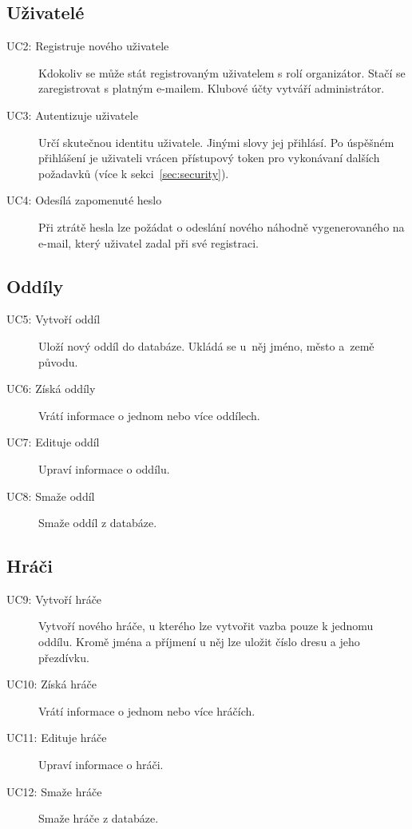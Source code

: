 \subsection*{Uživatelé}
  \begin{description}
    \item[UC2: Registruje nového uživatele]
      Kdokoliv se může stát registrovaným uživatelem s rolí organizátor. Stačí se zaregistrovat s platným e-mailem.
      Klubové účty vytváří administrátor.
    \item[UC3: Autentizuje uživatele]
      Určí skutečnou identitu uživatele. Jinými slovy jej přihlásí. Po úspěšném přihlášení je uživateli vrácen
      přístupový token pro vykonávaní dalších požadavků (více k sekci~\ref{sec:security}).
    \item[UC4: Odesílá zapomenuté heslo]
      Při ztrátě hesla lze požádat o odeslání nového náhodně vygenerovaného na e-mail, který uživatel zadal při své registraci.
  \end{description}

\subsection*{Oddíly}
  \begin{description}
    \item[UC5: Vytvoří oddíl]
      Uloží nový oddíl do databáze. Ukládá se u~něj jméno, město a~země původu.
    \item[UC6: Získá oddíly]
      Vrátí informace o jednom nebo více oddílech.
    \item[UC7: Edituje oddíl]
      Upraví informace o oddílu.
    \item[UC8: Smaže oddíl]
      Smaže oddíl z databáze.
  \end{description}

\subsection*{Hráči}
  \begin{description}
    \item[UC9: Vytvoří hráče]
      Vytvoří nového hráče, u kterého lze vytvořit vazba pouze k jednomu oddílu.
      Kromě jména a příjmení u něj lze uložit číslo dresu a jeho přezdívku.
    \item[UC10: Získá hráče]
      Vrátí informace o jednom nebo více hráčích.
    \item[UC11: Edituje hráče]
      Upraví informace o hráči.
    \item[UC12: Smaže hráče]
      Smaže hráče z databáze.
  \end{description}


